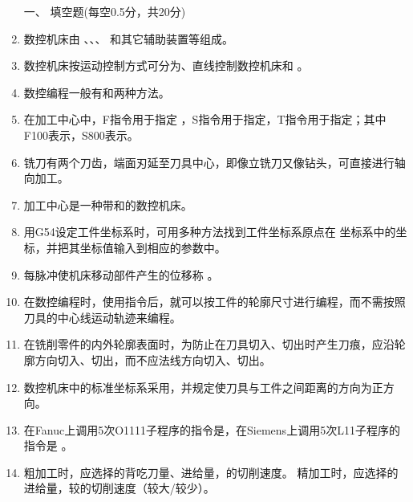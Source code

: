 \documentclass[12pt,twocolumn,landscape,UTF8,twoside]{ctexart}
\begin{document}
\begin{spacing}{1.3}
	\begin{enumerate} [1、]
		\item[\heiti 一、] {\heiti 填空题(每空0.5分，共20分)}
		\item 数控机床由 、、、 和其它辅助装置等组成。
		
		\item 数控机床按运动控制方式可分为、直线控制数控机床和	。
		
		\item 数控编程一般有和两种方法。
		
		\item 在加工中心中，F指令用于指定 ，S指令用于指定，T指令用于指定；其中F100表示，S800表示。
		
		\item {}铣刀有两个刀齿，端面刃延至刀具中心，即像立铣刀又像钻头，可直接进行轴向加工。
		
		\item 加工中心是一种带和的数控机床。

		\item 用G54设定工件坐标系时，可用多种方法找到工件坐标系原点在 坐标系中的坐标，并把其坐标值输入到相应的参数中。

		\item 每脉冲使机床移动部件产生的位移称  		。

		\item 在数控编程时，使用指令后，就可以按工件的轮廓尺寸进行编程，而不需按照刀具的中心线运动轨迹来编程。
		
		\item 在铣削零件的内外轮廓表面时，为防止在刀具切入、切出时产生刀痕，应沿轮廓方向切入、切出，而不应法线方向切入、切出。

		\item 数控机床中的标准坐标系采用，并规定使刀具与工件之间距离的方向为正方向。

		\item 在Fanuc上调用5次O1111子程序的指令是，在Siemens上调用5次L11子程序的指令是	。

		\item 粗加工时，应选择的背吃刀量、进给量，的切削速度。
		精加工时，应选择的进给量，较的切削速度（较大/较少）。
		

\end{enumerate}
\end{spacing}
\end{document}
